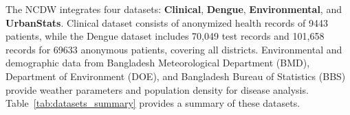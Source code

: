 The NCDW integrates four datasets: \textbf{Clinical}, \textbf{Dengue}, \textbf{Environmental}, and \textbf{UrbanStats}. Clinical dataset consists of anonymized health records of 9443 patients, while the Dengue dataset includes 70,049 test records and 101,658 records for 69633 anonymous patients, covering all districts. Environmental and demographic data from Bangladesh Meteorological Department (BMD),
Department of Environment (DOE),
and Bangladesh Bureau of Statistics (BBS)
provide weather parameters and population density for disease analysis. Table~\ref{tab:datasets_summary} provides a summary of these datasets.

